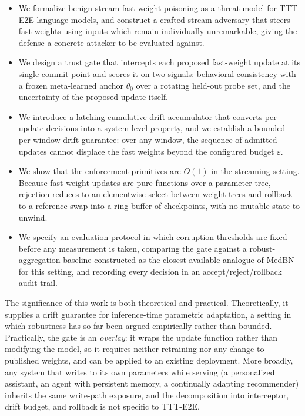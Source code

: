 \documentclass[journal]{IEEEtran}
\newcommand{\anchorp}{\theta_{0}}
\newcommand{\budget}{\varepsilon}
\begin{document}
\begin{itemize}
\item We formalize benign-stream fast-weight poisoning as a threat model for
TTT-E2E language models, and construct a crafted-stream adversary that steers fast
weights using inputs which remain individually unremarkable, giving the defense a
concrete attacker to be evaluated against.

\item We design a trust gate that intercepts each proposed fast-weight update at
its single commit point and scores it on two signals: behavioral consistency with a
frozen meta-learned anchor $\anchorp$ over a rotating held-out probe set, and the
uncertainty of the proposed update itself.

\item We introduce a latching cumulative-drift accumulator that converts per-update
decisions into a system-level property, and we establish a bounded per-window drift
guarantee: over any window, the sequence of admitted updates cannot displace the
fast weights beyond the configured budget $\budget$.

\item We show that the enforcement primitives are $O(1)$ in the streaming setting.
Because fast-weight updates are pure functions over a parameter tree, rejection
reduces to an elementwise select between weight trees and rollback to a reference
swap into a ring buffer of checkpoints, with no mutable state to unwind.

\item We specify an evaluation protocol in which corruption thresholds are fixed
before any measurement is taken, comparing the gate against a robust-aggregation
baseline constructed as the closest available analogue of MedBN for this setting,
and recording every decision in an accept/reject/rollback audit trail.
\end{itemize}

The significance of this work is both theoretical and practical. Theoretically, it
supplies a drift guarantee for inference-time parametric adaptation, a setting in
which robustness has so far been argued empirically rather than bounded.
Practically, the gate is an \emph{overlay}: it wraps the update function rather than
modifying the model, so it requires neither retraining nor any change to published
weights, and can be applied to an existing deployment. More broadly, any system that
writes to its own parameters while serving (a personalized assistant, an agent
with persistent memory, a continually adapting recommender) inherits the same
write-path exposure, and the decomposition into interceptor, drift budget, and
rollback is not specific to TTT-E2E.
\end{document}
